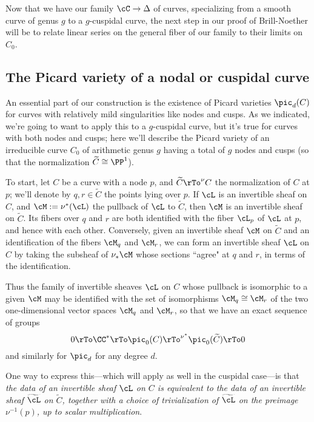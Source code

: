 Now that we have our family $\cC \to \Delta$ of curves, specializing from a smooth curve of genus $g$ to a $g$-cuspidal curve, the next step in our proof of Brill-Noether will be to relate linear series on the general fiber of our family to their limits on $C_0$.

\subsection{The Picard variety of a nodal or cuspidal curve}

An essential part of our construction is the existence of Picard varieties $\pic_d(C)$ for curves with relatively mild singularities like nodes and cusps. As we indicated, we're going to want to apply this to a $g$-cuspidal curve, but it's true for curves with both nodes and cusps; here we'll describe the Picard variety of an irreducible curve $C_0$ of arithmetic genus $g$ having a total of $g$ nodes and cusps (so that the normalization $\widetilde C \cong \PP^1$).


To start, let $C$ be a curve with a node $p$, and $\widetilde C \rTo^\nu C$ the normalization of $C$ at $p$; we'll denote by $q,r \in \widetilde C$ the points lying over $p$. If $\cL$ is an invertible sheaf on $C$, and $\cM := \nu^*(\cL)$ the pullback of $\cL$ to $\widetilde C$, then $\cM$ is an invertible sheaf on $\widetilde C$. Its fibers over $q$ and $r$ are both identified with the fiber $\cL_p$ of $\cL$ at $p$, and hence with each other. Conversely, given an invertible sheaf $\cM$ on $\widetilde C$ and an identification of the fibers $\cM_q$ and $\cM_r$, we can form an invertible sheaf $\cL$ on $C$ by taking the subsheaf of $\nu_*\cM$ whose sections ``agree" at $q$ and $r$, in terms of the identification. 


Thus the family of invertible sheaves $\cL$ on $C$ whose pullback is isomorphic to a given $\cM$ may be identified with the set of isomorphisms $\cM_q \cong \cM_r$ of the two one-dimensional vector spaces $\cM_q$ and $\cM_r$, so that  we have an exact sequence of groups
$$
0 \rTo  \CC^* \rTo \pic_0(C) \rTo^{\nu^*}  \pic_0(\widetilde C) \rTo 0
$$
and similarly for $\pic_d$ for any degree $d$.

One way to express this---which will apply as well in the cuspidal case---is that \emph{the data of an invertible sheaf $\cL$ on $C$ is equivalent to the data of an invertible sheaf $\widetilde \cL$ on $\widetilde C$, together with a choice of trivialization of $\widetilde \cL$ on the preimage $\nu^{-1}(p)$, up to scalar multiplication}.


